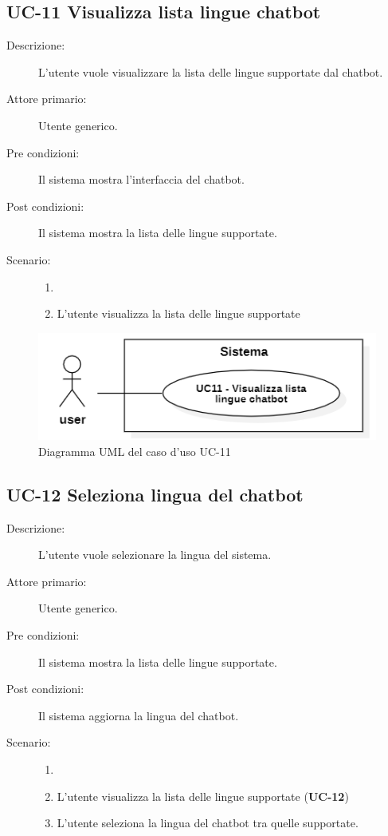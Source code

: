 \subsection{UC-11 Visualizza lista lingue chatbot}
\begin{description}
    \item[Descrizione:] L'utente vuole visualizzare la lista delle lingue supportate dal chatbot.
    \item[Attore primario:] Utente generico.
    \item[Pre condizioni:] Il sistema mostra l'interfaccia del chatbot.
    \item[Post condizioni:] Il sistema mostra la lista delle lingue supportate.
    \item[Scenario:]
    \begin{enumerate}
        \item[]
        \item L'utente visualizza la lista delle lingue supportate
    \end{enumerate}
\end{description}

\begin{figure}[H]
    \centering
    \includegraphics[width=0.8\linewidth]{UC11.png} %
    \caption{Diagramma UML del caso d'uso UC-11}
    \label{fig:UC14}
\end{figure}

\subsection{UC-12 Seleziona lingua del chatbot}
\begin{description}
    \item[Descrizione:] L'utente vuole selezionare la lingua del sistema.
    \item[Attore primario:] Utente generico.
    \item[Pre condizioni:] Il sistema mostra la lista delle lingue supportate.
    \item[Post condizioni:] Il sistema aggiorna la lingua del chatbot.
    \item[Scenario:]
    \begin{enumerate}
        \item[]
        \item L'utente visualizza la lista delle lingue supportate (\textbf{UC-12})
        \item L’utente seleziona la lingua del chatbot tra quelle supportate.
    \end{enumerate}
\end{description}

